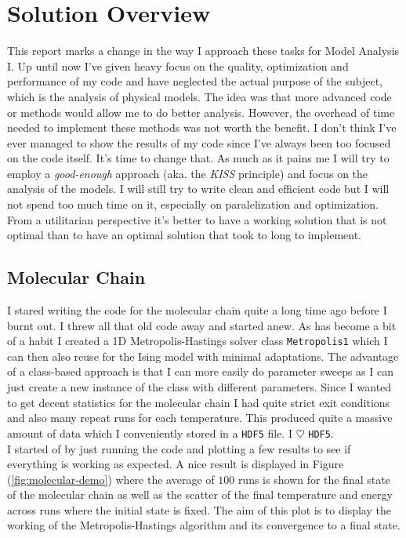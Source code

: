 \documentclass[10pt, titlepage, a4paper]{article}
\begin{document}
\section{Solution Overview}
This report marks a change in the way I approach these tasks for Model Analysis I. Up until now I've given heavy focus on the quality, optimization 
and performance of my code and have neglected the actual purpose of the subject, which is the analysis of physical models. The idea was that more 
advanced code or methods would allow me to do better analysis. However, the overhead of time needed to implement these methods was not worth the
benefit. I don't think I've ever managed to show the results of my code since I've always been too focused on the code itself. It's time to change
that. As much as it pains me I will try to employ a \textit{good-enough} approach (aka. the \textit{KISS} principle) and focus on the analysis of
the models. I will still try to write clean and efficient code but I will not spend too much time on it, especially on paralelization and optimization.
From a utilitarian perspective it's better to have a working solution that is not optimal than to have an optimal solution that took to long to 
implement. \\

\subsection{Molecular Chain}
I stared writing the code for the molecular chain quite a long time ago before I burnt out. I threw all that old code away and started anew. As has 
become a bit of a habit I created a 1D Metropolis-Hastings solver class \texttt{Metropolis1} which I can then also reuse for the Ising model 
with minimal adaptations. The advantage of a class-based approach is that I can more easily do parameter sweeps as I can just create a new instance
of the class with different parameters. Since I wanted to get decent statistics for the molecular chain I had quite strict exit conditions and also 
many repeat runs for each temperature. This produced quite a massive amount of data which I conveniently stored in a \texttt{HDF5} file. I $\heartsuit$
\texttt{HDF5}. \\

I started of by just running the code and plotting a few results to see if everything is working 
as expected. A nice result is displayed in Figure (\ref{fig:molecular-demo}) where the average of $100$ runs is shown 
for the final state of the molecular chain as well as the scatter of the final temperature and energy across runs where 
the initial state is fixed. The aim of this plot is to display the working of the Metropolis-Hastings algorithm and its 
convergence to a final state. 
\end{document}
